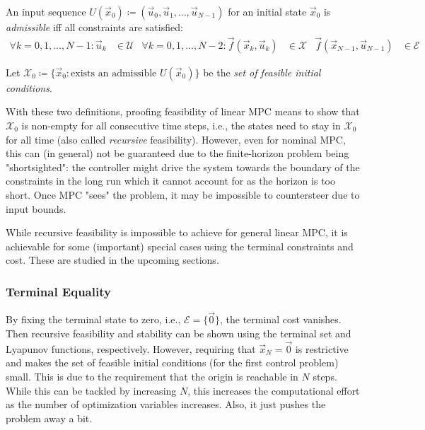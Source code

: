 			\begin{definition}
				An input sequence \( U(\vec{x}_0) \coloneqq (\vec{u}_0, \vec{u}_1, \dots, \vec{u}_{N - 1}) \) for an initial state \(\vec{x}_0\) is \emph{admissible} iff all constraints are satisfied:
				\begin{align}
					\forall k = 0, 1, \dots, N - 1 : \vec{u}_k &\in \mathcal{U} &
					\forall k = 0, 1, \dots, N - 2 : \vec{f}(\vec{x}_k, \vec{u}_k) &\in \mathcal{X} &
					\vec{f}(\vec{x}_{N - 1}, \vec{u}_{N - 1}) &\in \mathcal{E}
				\end{align}
			\end{definition}
			\begin{definition}
				Let \( \mathcal{X}_0 \coloneqq \bigl\{ \vec{x}_0 : \text{exists an admissible }U(\vec{x}_0) \bigr\} \) be the \emph{set of feasible initial conditions}.
			\end{definition}

			With these two definitions, proofing feasibility of linear MPC means to show that \(\mathcal{X}_0\) is non-empty for all consecutive time steps, i.e., the states need to stay in \(\mathcal{X}_0\) for all time (also called \emph{recursive} feasibility). However, even for nominal MPC, this can (in general) not be guaranteed due to the finite-horizon problem being "shortsighted": the controller might drive the system towards the boundary of the constraints in the long run which it cannot account for as the horizon is too short. Once MPC "sees" the problem, it may be impossible to countersteer due to input bounds.

			While recursive feasibility is impossible to achieve for general linear MPC, it is achievable for some (important) special cases using the terminal constraints and cost. These are studied in the upcoming sections.

			\subsubsection{Terminal Equality}
				By fixing the terminal state to zero, i.e., \( \mathcal{E} = \{ \vec{0} \} \), the terminal cost vanishes. Then recursive feasibility and stability can be shown using the terminal set and Lyapunov functions, respectively. However, requiring that \( \vec{x}_N = \vec{0} \) is restrictive and makes the set of feasible initial conditions (for the first control problem) small. This is due to the requirement that the origin is reachable in \(N\) steps. While this can be tackled by increasing \(N\), this increases the computational effort as the number of optimization variables increases. Also, it just pushes the problem away a bit.

